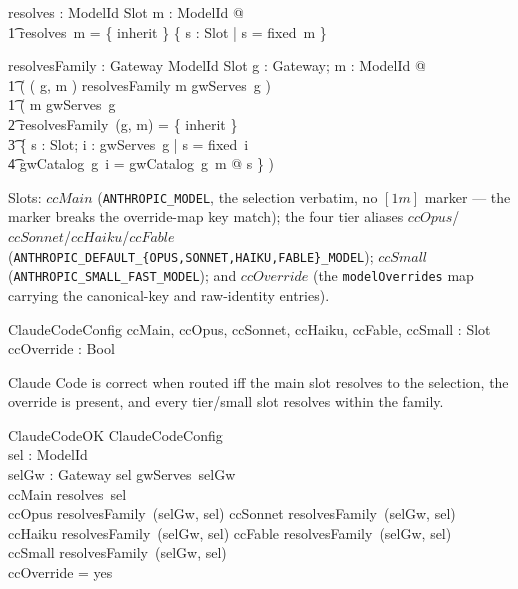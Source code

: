 \documentclass{article}
\begin{document}
\begin{axdef}
  resolves : ModelId \fun \power Slot
\where
  \forall m : ModelId @ \\
  \t1 resolves~m = \{ inherit \} \cup \{ s : Slot | s = fixed~m \}
\end{axdef}

\begin{axdef}
  resolvesFamily : Gateway \cross ModelId \pfun \power Slot
\where
  \forall g : Gateway; m : ModelId @ \\
  \t1 ( ( g, m ) \in \dom resolvesFamily \iff m \in gwServes~g ) \land \\
  \t1 ( m \in gwServes~g \implies \\
  \t2   resolvesFamily~(g, m) = \{ inherit \} \cup \\
  \t3   \{ s : Slot; i : gwServes~g | s = fixed~i \land \\
  \t4     gwCatalog~g~i = gwCatalog~g~m @ s \} )
\end{axdef}

Slots: $ccMain$ (\texttt{ANTHROPIC\_MODEL}, the selection verbatim, no $[1m]$
marker --- the marker breaks the override-map key match); the four tier aliases
$ccOpus$/$ccSonnet$/$ccHaiku$/$ccFable$
(\texttt{ANTHROPIC\_DEFAULT\_\{OPUS,SONNET,HAIKU,FABLE\}\_MODEL}); $ccSmall$
(\texttt{ANTHROPIC\_SMALL\_FAST\_MODEL}); and $ccOverride$ (the
\texttt{modelOverrides} map carrying the canonical-key and raw-identity entries).

\begin{schema}{ClaudeCodeConfig}
  ccMain, ccOpus, ccSonnet, ccHaiku, ccFable, ccSmall : Slot \\
  ccOverride : Bool
\end{schema}

Claude Code is correct when routed iff the main slot resolves to the selection,
the override is present, and every tier/small slot resolves within the family.

\begin{schema}{ClaudeCodeOK}
  ClaudeCodeConfig \\
  sel : ModelId \\
  selGw : Gateway
\where
  sel \in gwServes~selGw \\
  ccMain \in resolves~sel \\
  ccOpus \in resolvesFamily~(selGw, sel) \land ccSonnet \in resolvesFamily~(selGw, sel) \\
  ccHaiku \in resolvesFamily~(selGw, sel) \land ccFable \in resolvesFamily~(selGw, sel) \\
  ccSmall \in resolvesFamily~(selGw, sel) \\
  ccOverride = yes
\end{schema}
\end{document}
